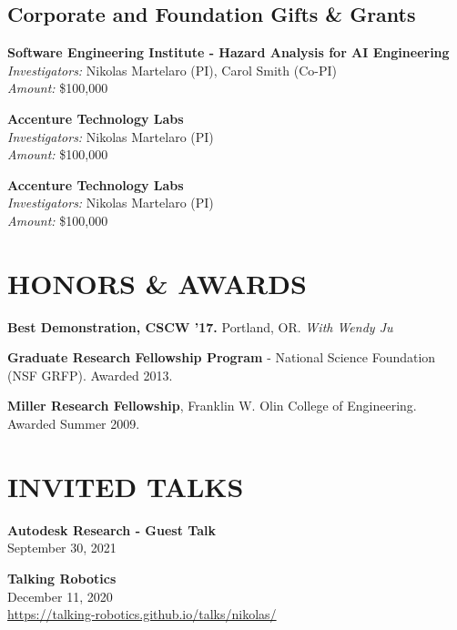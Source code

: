 \documentclass[11pt]{article} %
\begin{document}
\subsection*{Corporate and Foundation Gifts \& Grants}
 \textbf{Software Engineering Institute - Hazard Analysis for AI Engineering}\\
\textit{Investigators:} Nikolas Martelaro (PI), Carol Smith (Co-PI)\\
\textit{Amount:} \$100,000
\medskip

 \textbf{Accenture Technology Labs}\\
\textit{Investigators:} Nikolas Martelaro (PI)\\
\textit{Amount:} \$100,000
\medskip

 \textbf{Accenture Technology Labs}\\
\textit{Investigators:} Nikolas Martelaro (PI)\\
\textit{Amount:} \$100,000


\section*{HONORS \& AWARDS}
\textbf{Best Demonstration, CSCW ’17.} Portland, OR. \textit{With Wendy Ju}
\medskip

\textbf{Graduate Research Fellowship Program} - National Science Foundation (NSF GRFP). Awarded 2013.
\medskip

\textbf{Miller Research Fellowship}, Franklin W. Olin College of Engineering. Awarded Summer 2009.


\section*{INVITED TALKS}
\textbf{Autodesk Research - Guest Talk}\\
September 30, 2021
\medskip

 \textbf{Talking Robotics}\\
December 11, 2020\\
\url{https://talking-robotics.github.io/talks/nikolas/}
\end{document}
